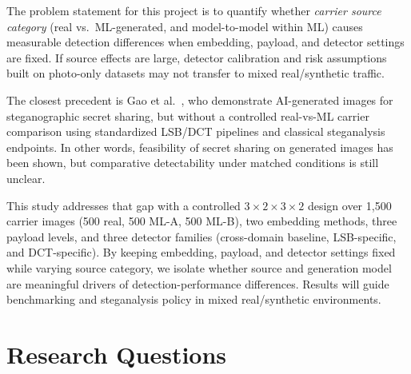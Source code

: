 \documentclass[10pt,twocolumn,a4paper]{article}
\begin{document}
The problem statement for this project is to quantify whether \emph{carrier source category} (real vs.\ ML-generated, and model-to-model within ML) causes measurable detection differences when embedding, payload, and detector settings are fixed. If source effects are large, detector calibration and risk assumptions built on photo-only datasets may not transfer to mixed real/synthetic traffic.

The closest precedent is Gao et al.~\cite{gao2022ai}, who demonstrate AI-generated images for steganographic secret sharing, but without a controlled real-vs-ML carrier comparison using standardized LSB/DCT pipelines and classical steganalysis endpoints. In other words, feasibility of secret sharing on generated images has been shown, but comparative detectability under matched conditions is still unclear.

This study addresses that gap with a controlled $3\!\times\!2\!\times\!3\!\times\!2$ design over 1{,}500 carrier images (500 real, 500 ML-A, 500 ML-B), two embedding methods, three payload levels, and three detector families (cross-domain baseline, LSB-specific, and DCT-specific). By keeping embedding, payload, and detector settings fixed while varying source category, we isolate whether source and generation model are meaningful drivers of detection-performance differences. Results will guide benchmarking and steganalysis policy in mixed real/synthetic environments.

\section{Research Questions}
\end{document}
